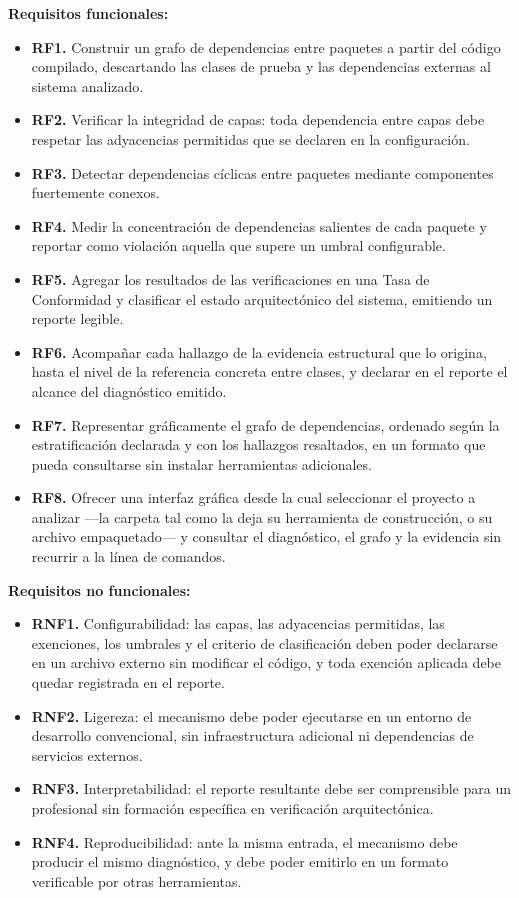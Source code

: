 \textbf{Requisitos funcionales:}
\begin{itemize}
    \item \textbf{RF1.} Construir un grafo de dependencias entre paquetes a partir del código compilado, descartando las clases de prueba y las dependencias externas al sistema analizado.
    \item \textbf{RF2.} Verificar la integridad de capas: toda dependencia entre capas debe respetar las adyacencias permitidas que se declaren en la configuración.
    \item \textbf{RF3.} Detectar dependencias cíclicas entre paquetes mediante componentes fuertemente conexos.
    \item \textbf{RF4.} Medir la concentración de dependencias salientes de cada paquete y reportar como violación aquella que supere un umbral configurable.
    \item \textbf{RF5.} Agregar los resultados de las verificaciones en una Tasa de Conformidad y clasificar el estado arquitectónico del sistema, emitiendo un reporte legible.
    \item \textbf{RF6.} Acompañar cada hallazgo de la evidencia estructural que lo origina, hasta el nivel de la referencia concreta entre clases, y declarar en el reporte el alcance del diagnóstico emitido.
    \item \textbf{RF7.} Representar gráficamente el grafo de dependencias, ordenado según la estratificación declarada y con los hallazgos resaltados, en un formato que pueda consultarse sin instalar herramientas adicionales.
    \item \textbf{RF8.} Ofrecer una interfaz gráfica desde la cual seleccionar el proyecto a analizar ---la carpeta tal como la deja su herramienta de construcción, o su archivo empaquetado--- y consultar el diagnóstico, el grafo y la evidencia sin recurrir a la línea de comandos.
\end{itemize}

\textbf{Requisitos no funcionales:}
\begin{itemize}
    \item \textbf{RNF1.} Configurabilidad: las capas, las adyacencias permitidas, las exenciones, los umbrales y el criterio de clasificación deben poder declararse en un archivo externo sin modificar el código, y toda exención aplicada debe quedar registrada en el reporte.
    \item \textbf{RNF2.} Ligereza: el mecanismo debe poder ejecutarse en un entorno de desarrollo convencional, sin infraestructura adicional ni dependencias de servicios externos.
    \item \textbf{RNF3.} Interpretabilidad: el reporte resultante debe ser comprensible para un profesional sin formación específica en verificación arquitectónica.
    \item \textbf{RNF4.} Reproducibilidad: ante la misma entrada, el mecanismo debe producir el mismo diagnóstico, y debe poder emitirlo en un formato verificable por otras herramientas.
\end{itemize}

